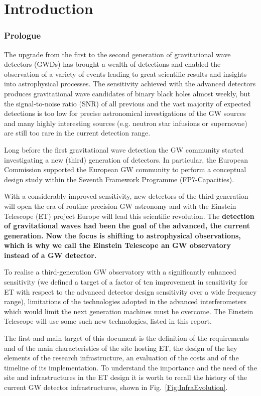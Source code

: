 \chapter{Introduction}
\label{chap:Intro}

\subsection[Prologue]{Prologue}
\label{Prologue}
The upgrade from the first to the second generation of gravitational wave detectors (GWDs) has brought a wealth of detections and enabled the observation of a variety of events leading to great scientific results and insights into astrophysical processes. The sensitivity achieved with the advanced detectors produces gravitational wave candidates of binary black holes almost weekly, but the signal-to-noise ratio (SNR) of all previous and the vast majority of expected detections is too low for precise astronomical investigations of the GW sources and many highly interesting sources (e.g. neutron star infusions or supernovae) are still too rare in the current detection range. \par
Long before the first gravitational wave detection the GW community started investigating a new (third) generation of detectors. In particular, the European Commission supported the European GW community to perform a conceptual design study within the Seventh Framework Programme (FP7-Capacities).\par 
With a considerably improved sensitivity, new detectors of the third-generation will open the era of routine precision GW astronomy and with the Einstein Telescope (ET) project Europe will lead this scientific revolution. The \bf{detection} of gravitational waves had been the goal of the advanced, the current generation. Now the focus is shifting to astrophysical \bf{observations}, which is why we call the Einstein Telescope an GW \bf{observatory} instead of a GW \bf{detector}.\par
To realise a third-generation GW observatory with a significantly enhanced sensitivity (we defined a target of a factor of ten improvement in sensitivity for ET with respect to the advanced detector design sensitivity over a wide frequency range), limitations of the technologies adopted in the advanced interferometers which would limit the next generation machines must be overcome. The Einstein Telescope will use some such new technologies, listed in this report.\par
The first and main target of this document is the definition of  the requirements and of the main characteristics of the site hosting ET, the design of the key elements of the research infrastructure, an evaluation of the costs and of the timeline of its implementation. To understand the importance and the need of the site and infrastructures in the ET design it is worth to recall the history of the current GW detector infrastructures, shown in Fig.~\ref{Fig:InfraEvolution}.

